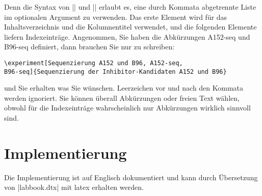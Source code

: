 \documentclass[a4paper]{article}
\begin{document}
\DescribeMacro{\subexperiment}\DescribeMacro{\experiment}
Denn die Syntax von |\experiment| und |\subexperiment| erlaubt es,
eine durch Kommata abgetrennte Liste im optionalen Argument zu
verwenden. Das erste Element wird f^^fcr das Inhaltsverzeichnis und die
Kolumnentitel verwendet, und die folgenden Elemente liefern
Indexeintr^^e4ge. Angenommen, Sie haben die Abk^^fcrzungen A152-seq und
B96-seq definiert, dann brauchen Sie nur zu schreiben:
\begin{verbatim}
\experiment[Sequenzierung A152 und B96, A152-seq,
B96-seq]{Sequenzierung der Inhibitor-Kandidaten A152 und B96}
\end{verbatim}
und Sie erhalten was Sie w^^fcnschen. Leerzeichen vor und nach den
Kommata werden ignoriert. Sie k^^f6nnen ^^fcberall Abk^^fcrzungen oder freien
Text w^^e4hlen, obwohl f^^fcr die Indexeintr^^e4ge wahrscheinlich nur
Abk^^fcrzungen wirklich sinnvoll sind.

\section{Implementierung}

Die Implementierung ist auf Englisch dokumentiert und kann durch
^^dcbersetzung von |labbook.dtx| mit latex erhalten werden.

\PrintIndex
\end{document}
